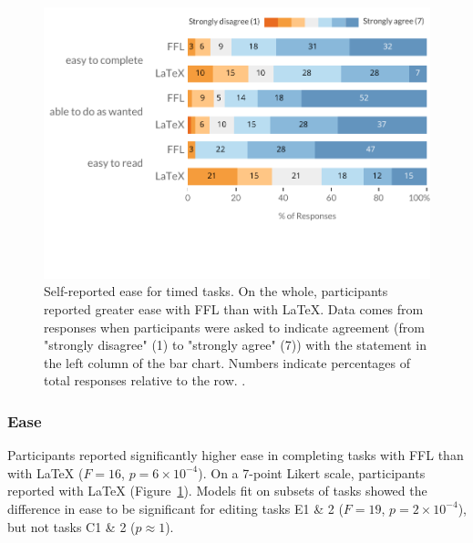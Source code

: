 \begin{figure}
    \centering
    \includegraphics[width=\linewidth]{fig/Responses.pdf}
    \vspace{-2.5em}
    \caption{Self-reported ease for timed tasks. On the whole, participants reported greater ease with FFL than with LaTeX. \normalfont Data comes from responses when participants were asked to indicate agreement (from "strongly disagree" (1) to "strongly agree" (7)) with the statement in the left column of the bar chart. Numbers indicate percentages of total responses relative to the row. .}
    \label{fig:responses}
\end{figure}

\subsubsection{Ease}\label{sec:ease}

Participants reported significantly higher ease in completing tasks with FFL than with LaTeX ($F=16$, $p=6\times10^{-4}$). On a 7-point Likert scale, participants reported  with LaTeX (Figure~\ref{fig:responses}). Models fit on subsets of tasks showed the difference in ease to be significant for editing tasks E1 \& 2 ($F=19$, $p=2\times10^{-4}$), but not tasks C1 \& 2 ($p\approx1$).

